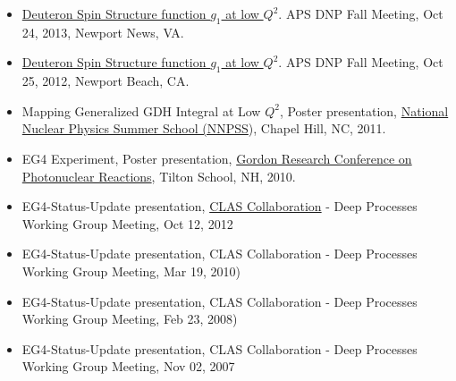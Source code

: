 \documentclass[10pt, letterpaper]{article}
\begin{document}
\begin{itemize}
\item \href{http://meetings.aps.org/Meeting/DNP13/Session/CH.7}{Deuteron Spin Structure function $g_1$ at low $Q^2$}. APS DNP Fall Meeting, Oct 24, 2013, Newport News, VA.
\item \href{http://meetings.aps.org/Meeting/DNP12/Session/FC.2}{Deuteron Spin Structure function $g_1$ at low $Q^2$}. APS DNP Fall Meeting, Oct 25, 2012, Newport Beach, CA.
\item Mapping Generalized GDH Integral at Low $Q^2$, Poster presentation, \href{http://www.tunl.duke.edu/nnpss/web.tunl.nnpss.reg.php}{National Nuclear Physics Summer School (NNPSS}), Chapel Hill, NC, 2011. %
\item EG4 Experiment, Poster presentation, \href{http://www.grc.org/programs.aspx?year=2010&program=photonuc}{Gordon Research Conference on Photonuclear Reactions}, Tilton School, NH, 2010. %
\item EG4-Status-Update presentation, \href{http://www.jlab.org/Hall-B/claschair/Clas_Chair_page.htm}{CLAS Collaboration} - Deep Processes Working Group Meeting, Oct 12, 2012
\item EG4-Status-Update presentation, CLAS Collaboration - Deep Processes Working Group Meeting, Mar 19, 2010)
\item EG4-Status-Update presentation, CLAS Collaboration - Deep Processes Working Group Meeting, Feb 23, 2008)
\item EG4-Status-Update presentation, CLAS Collaboration - Deep Processes Working Group Meeting, Nov 02, 2007 

\end{itemize}
\end{document}

